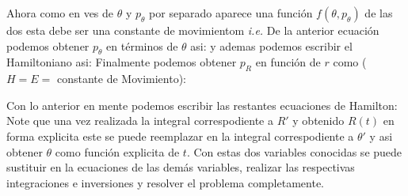 Ahora como en ves de $\theta$ y $p_\theta$ por separado aparece una funci\'on  $f\left(\theta,p_\theta\right)$ de las dos esta debe ser una constante de movimientom \emph{i.e.} 
De la anterior ecuaci\'on podemos obtener $p_\theta$ en t\'erminos de $\theta$ asi:
y ademas podemos escribir el Hamiltoniano asi:
Finalmente podemos obtener $p_R$ en funci\'on de $r$ como ($H=E=$ constante de Movimiento):

Con lo anterior en mente podemos escribir las restantes ecuaciones de Hamilton:
Note que una vez realizada la integral correspodiente a $R'$ y obtenido $R\left(t\right)$ en forma explicita este se puede reemplazar en la integral correspodiente a $\theta'$ y asi obtener $\theta$ como funci\'on explicita de $t$. Con estas dos variables conocidas se puede sustituir en la ecuaciones de las dem\'as variables, realizar las respectivas integraciones e inversiones y resolver el problema completamente.




